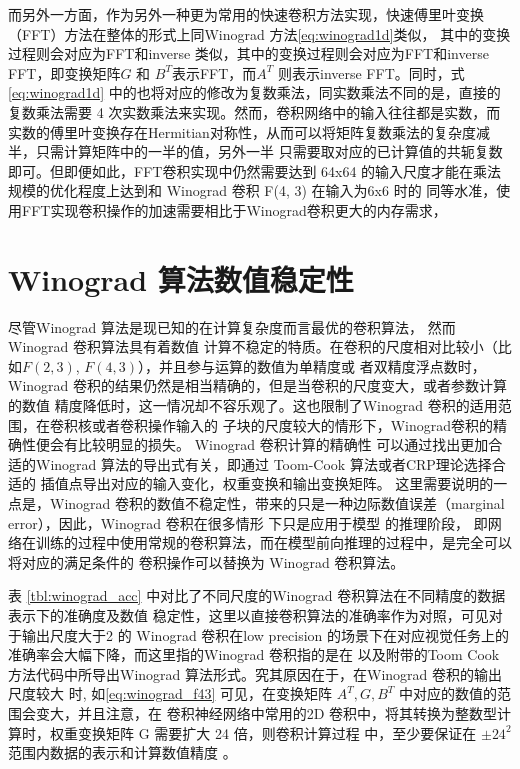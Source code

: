 而另外一方面，作为另外一种更为常用的快速卷积方法实现，快速傅里叶变换（FFT）方法在整体的形式上同Winograd 方法\ref{eq:winograd1d}类似，
其中的变换过程则会对应为FFT和inverse 类似，其中的变换过程则会对应为FFT和inverse
 FFT，即变换矩阵$G$ 和 $B^T$表示FFT，而$A^T$ 则表示inverse FFT。同时，式\ref{eq:winograd1d} 中的也将对应的修改为复数乘法，同实数乘法不同的是，直接的复数乘法需要
 4 次实数乘法来实现。然而，卷积网络中的输入往往都是实数，而实数的傅里叶变换存在Hermitian对称性，从而可以将矩阵复数乘法的复杂度减半，只需计算矩阵中的一半的值，另外一半
 只需要取对应的已计算值的共轭复数即可。但即便如此，FFT卷积实现中仍然需要达到 64x64 的输入尺度才能在乘法规模的优化程度上达到和 Winograd 卷积 F(4, 3) 在输入为6x6 时的
 同等水准，使用FFT实现卷积操作的加速需要相比于Winograd卷积更大的内存需求，


\section{Winograd 算法数值稳定性}

尽管Winograd 算法是现已知的在计算复杂度而言最优的卷积算法， 然而 Winograd 卷积算法具有着数值
计算不稳定的特质。在卷积的尺度相对比较小（比如$F(2,3)$, $F(4, 3)$），并且参与运算的数值为单精度或
者双精度浮点数时，Winograd 卷积的结果仍然是相当精确的，但是当卷积的尺度变大，或者参数计算的数值
精度降低时，这一情况却不容乐观了。这也限制了Winograd 卷积的适用范围，在卷积核或者卷积操作输入的
子块的尺度较大的情形下，Winograd卷积的精确性便会有比较明显的损失。 Winograd 卷积计算的精确性
可以通过找出更加合适的Winograd 算法的导出式有关，即通过 Toom-Cook 算法或者CRP理论选择合适的
插值点导出对应的输入变化，权重变换和输出变换矩阵。 这里需要说明的一点是，Winograd 
卷积的数值不稳定性，带来的只是一种边际数值误差（marginal error），因此，Winograd 卷积在很多情形
下只是应用于模型 的推理阶段，
即网络在训练的过程中使用常规的卷积算法，而在模型前向推理的过程中，是完全可以将对应的满足条件的
卷积操作可以替换为 Winograd 卷积算法。

表 \ref{tbl:winograd_acc} 中对比了不同尺度的Winograd 卷积算法在不同精度的数据表示下的准确度及数值
稳定性，这里以直接卷积算法的准确率作为对照，可见对于输出尺度大于2 的 Winograd 卷积在low precision 
的场景下在对应视觉任务上的准确率会大幅下降，而这里指的Winograd 卷积指的是在 \cite{Lavin2015FastAF}
以及附带的Toom Cook 方法代码中所导出Winograd 算法形式。究其原因在于，在Winograd 卷积的输出尺度较大
时, 如\ref{eq:winograd_f43} 可见，在变换矩阵 $A^T, G, B^T$ 中对应的数值的范围会变大，并且注意，在
卷积神经网络中常用的2D 卷积中，将其转换为整数型计算时，权重变换矩阵 G 需要扩大 24 倍，则卷积计算过程
中，至少要保证在 $\pm24^2$ 范围内数据的表示和计算数值精度 。

